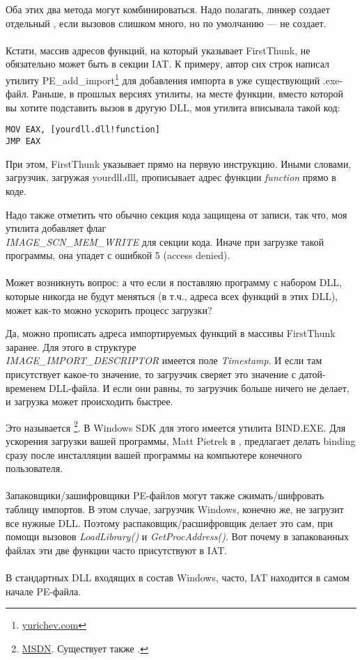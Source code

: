 Оба этих два метода могут комбинироваться.
Надо полагать, линкер создает отдельный , если вызовов слишком много, но по умолчанию --- не создает. \\
\\
Кстати, массив адресов функций, на который указывает FirstThunk,
не обязательно может быть в секции \ac{IAT}.
К примеру, автор сих строк написал утилиту
PE\_add\_import\footnote{\href{http://go.yurichev.com/17049}{yurichev.com}} 
для добавления импорта в уже существующий .exe-файл.
Раньше, в прошлых версиях утилиты, на месте функции, вместо которой вы хотите подставить вызов в другую DLL,
моя утилита вписывала такой код:

\begin{lstlisting}[style=customasmx86]
MOV EAX, [yourdll.dll!function]
JMP EAX
\end{lstlisting}

При этом, FirstThunk указывает прямо на первую инструкцию.
Иными словами, загрузчик, загружая yourdll.dll, прописывает адрес функции \emph{function} прямо в коде.

Надо также отметить что обычно секция кода защищена от записи, так что, моя утилита добавляет флаг \\
\emph{IMAGE\_SCN\_MEM\_WRITE} 
для секции кода. Иначе при загрузке такой программы, она упадет с ошибкой 5 (access denied). \\
\\
Может возникнуть вопрос: а что если я поставляю программу с набором DLL,
которые никогда не будут меняться (в т.ч., адреса всех функций в этих DLL), может как-то можно ускорить процесс загрузки?

Да, можно прописать адреса импортируемых функций в массивы FirstThunk заранее.
Для этого в структуре \\
\emph{IMAGE\_IMPORT\_DESCRIPTOR} имеется поле \emph{Timestamp}.
И если там присутствует какое-то значение, то загрузчик сверяет это значение с датой-временем DLL-файла.
И если они равны, то загрузчик больше ничего не делает, и загрузка может происходить быстрее.

Это называется 
\footnote{\href{http://go.yurichev.com/17050}{MSDN}.
Существует также .}.
В Windows SDK для этого имеется утилита BIND.EXE.
Для ускорения загрузки вашей программы, 
Matt Pietrek в \PietrekPEURL, предлагает делать binding сразу после инсталляции
вашей программы на компьютере конечного пользователя. \\
\\
Запаковщики/зашифровщики PE-файлов могут также сжимать/шифровать таблицу импортов.
В этом случае, загрузчик Windows, конечно же, не загрузит все нужные DLL.
Поэтому распаковщик/расшифровщик делает это сам, при помощи вызовов \emph{LoadLibrary()} и \emph{GetProcAddress()}.
Вот почему в запакованных файлах эти две функции часто присутствуют в \ac{IAT}. \\
\\
В стандартных DLL входящих в состав Windows, часто, \ac{IAT} находится в самом начале PE-файла.

